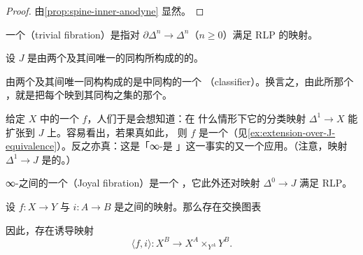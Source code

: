 \begin{proof}
由\cref{prop:spine-inner-anodyne} 显然。
\end{proof}

\begin{definition}\label{def:trivial-fibration}
一个\emph{\trTrivialFibration{}}（trivial fibration）是指对\trBoundaryInclusion{}%
$\partial\Delta^n \to \Delta^n$（$n \ge 0$）满足 RLP 的映射。
\end{definition}

\begin{definition}\label{def:J}
设 $J$ 是由两个\trObject{}及其间唯一的同构所构成的\trCategory{}的\trNerve{}。
\end{definition}

\begin{observation}\label{obs:J-classifier}
由两个\trObject{}及其间唯一同构构成的\trCategory{}是\trCategory{}中同构的一个\trClassifier{}%
（classifier）。换言之，由此\trCategory{}所\trCorepresented{}那个%
\trFunctor{}，就是把每个\trCategory{}映到其同构之集的那个\trFunctor{}。

给定\trInfinityCategory{} $X$ 中的一个\trMorphism{} $f$，人们于是会想知道：在
什么情形下它的分类映射 $\Delta^1 \to X$ 能扩张到 $J$ 上。容易看出，若果真如此，
则 $f$ 是一个\trEquivalence{}（见\cref{ex:extension-over-J-equivalence}）。反之亦真：这是「∞-\trGroupoid{}是%
\trKanComplex{}」这一事实的又一个应用。（注意，映射 $\Delta^1 \to J$ 是\trAnodyne{}的。）
\end{observation}

\begin{definition}\label{def:joyal-fibration}
∞-\trCategories{}之间的一个\emph{\trJoyalFibration{}}（Joyal fibration）是一个%
\trInnerFibration{}，它此外还对映射 $\Delta^0 \to J$ 满足 RLP。
\end{definition}

\begin{construction}\label{con:angle-f-i}
设 $f\colon X \to Y$ 与 $i\colon A \to B$ 是\trSimplicialSet{}之间的映射。那么存在交换图表
\begin{center}
\end{center}
因此，存在诱导映射
\[
\langle f, i \rangle\colon X^B \to X^A \times_{Y^A} Y^B.
\]
\end{construction}

